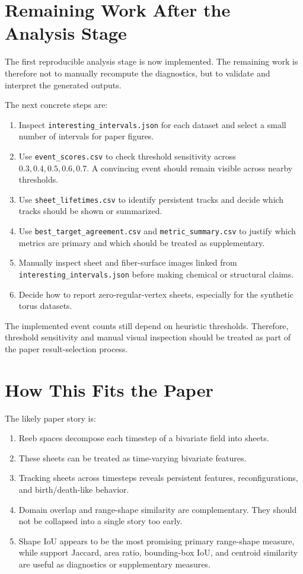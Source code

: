 \documentclass[11pt]{article}
\begin{document}
\section{Remaining Work After the Analysis Stage}

The first reproducible analysis stage is now implemented. The remaining work is
therefore not to manually recompute the diagnostics, but to validate and
interpret the generated outputs.

The next concrete steps are:

\begin{enumerate}[leftmargin=*]
\item Inspect \texttt{interesting\_intervals.json} for each dataset and select a
  small number of intervals for paper figures.
\item Use \texttt{event\_scores.csv} to check threshold sensitivity across
  \(0.3,0.4,0.5,0.6,0.7\). A convincing event should remain visible across
  nearby thresholds.
\item Use \texttt{sheet\_lifetimes.csv} to identify persistent tracks and decide
  which tracks should be shown or summarized.
\item Use \texttt{best\_target\_agreement.csv} and
  \texttt{metric\_summary.csv} to justify which metrics are primary and which
  should be treated as supplementary.
\item Manually inspect sheet and fiber-surface images linked from
  \texttt{interesting\_intervals.json} before making chemical or structural
  claims.
\item Decide how to report zero-regular-vertex sheets, especially for the
  synthetic torus datasets.
\end{enumerate}

The implemented event counts still depend on heuristic thresholds. Therefore,
threshold sensitivity and manual visual inspection should be treated as part of
the paper result-selection process.

\section{How This Fits the Paper}

The likely paper story is:

\begin{enumerate}[leftmargin=*]
\item Reeb spaces decompose each timestep of a bivariate field into sheets.
\item These sheets can be treated as time-varying bivariate features.
\item Tracking sheets across timesteps reveals persistent features,
  reconfigurations, and birth/death-like behavior.
\item Domain overlap and range-shape similarity are complementary. They should
  not be collapsed into a single story too early.
\item Shape IoU appears to be the most promising primary range-shape measure,
  while support Jaccard, area ratio, bounding-box IoU, and centroid similarity
  are useful as diagnostics or supplementary measures.
\end{enumerate}
\end{document}
